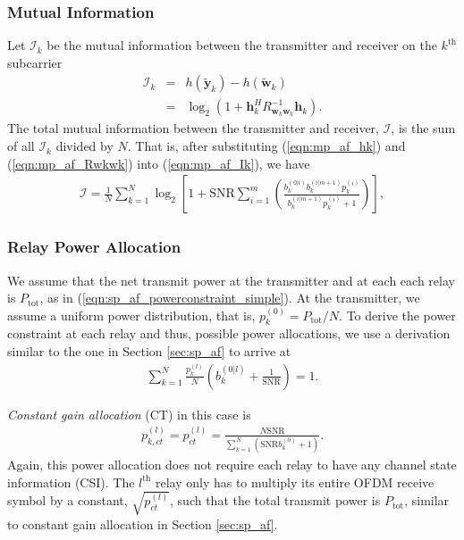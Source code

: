 \documentclass[journal]{IEEEtran}
\begin{document}
\subsubsection{Mutual Information}
Let $\mathcal{I}_k$ be the mutual information between the
transmitter and receiver on the $k^{\mbox{th}}$ subcarrier
\begin{eqnarray}
\mathcal{I}_k & = & h\left( \tilde{\mathbf{y}}_k \right) - h \left( \tilde{\mathbf{w}}_k \right) \nonumber \\
& = & \log_2 \left( 1 + \mathbf{h}_k^H
R_{\mathbf{w}_k\mathbf{w}_k}^{-1} \mathbf{h}_k \right).
\label{eqn:mp_af_Ik}
\end{eqnarray}
The total mutual information between the transmitter and receiver,
$\mathcal{I}$, is the sum of all $\mathcal{I}_k$ divided by $N$.
That is, after substituting (\ref{eqn:mp_af_hk}) and
(\ref{eqn:mp_af_Rwkwk}) into (\ref{eqn:mp_af_Ik}), we have
\begin{eqnarray}
\mathcal{I} =
 \frac{1}{N}  \sum_{k=1}^N \log_2 \left[ 1 +
\mbox{SNR} \sum_{i=1}^m \left( \frac{b_k^{(0|i)}
b_k^{(i|m+1)}p_k^{(i)}  }{ b_k^{(i|m+1)} p_k^{(i)}+1 }\right)
\right], \label{eqn:mp_af_I}
\end{eqnarray}
\subsubsection{Relay Power Allocation}
We assume that the net transmit power at the transmitter and at
each each relay is $P_{\mbox{tot}}$, as in
(\ref{eqn:sp_af_powerconstraint_simple}).  At the transmitter, we
assume a uniform power distribution, that is, $p_k^{(0)} =
P_{\mbox{tot}}/N$.  To derive the power constraint at each relay
and thus, possible power allocations, we use a derivation similar
to the one in Section \ref{sec:sp_af} to arrive at
\begin{eqnarray}
\sum_{k=1}^N \frac{ p_k^{(l)}}{N} \left(
b_k^{(0|l)} +
\frac{1}{\mbox{SNR}} \right) =1.
\label{eqn:mp_af_powerconstraint}
\end{eqnarray}

\emph{Constant gain allocation} (CT) in this case is
\begin{eqnarray}
p_{k,ct}^{(l)} = p_{ct}^{(l)} =
 \frac{N \mbox{SNR}}
{\displaystyle \sum_{k=1}^N \left( \mbox{SNR} b_k^{(0)} + 1 \right)
} \mbox{.}
\end{eqnarray}
Again, this power allocation does not require each relay to have
any channel state information (CSI).  The $l^{\mbox{th}}$ relay
only has to multiply its entire OFDM receive symbol by a constant,
$\sqrt{p_{ct}^{(l)}}$, such that the total transmit power is
$P_{\mbox{tot}}$, similar to constant gain allocation in Section
\ref{sec:sp_af}.
\end{document}
